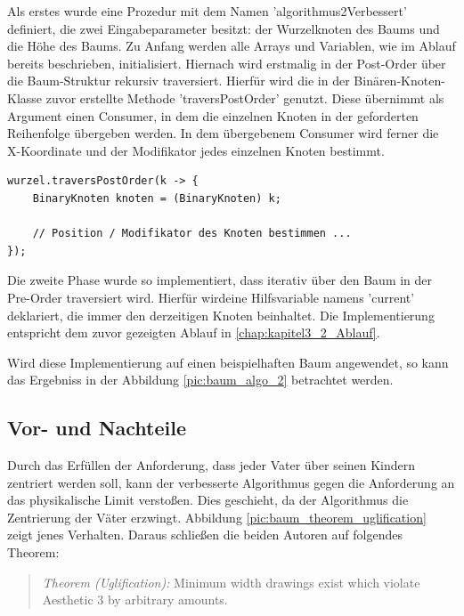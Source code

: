 Als erstes wurde eine Prozedur mit dem Namen 
'algorithmus2Verbessert' definiert, die zwei Eingabeparameter besitzt: der Wurzelknoten des Baums 
und die Höhe des Baums. Zu Anfang werden alle Arrays und Variablen, wie im Ablauf 
bereits beschrieben, initialisiert. Hiernach wird erstmalig in der Post-Order über 
die Baum-Struktur rekursiv traversiert. Hierfür wird die in der Binären-Knoten-Klasse 
zuvor erstellte Methode 'traversPostOrder' genutzt. Diese übernimmt als Argument einen Consumer, 
in dem die einzelnen Knoten in der geforderten Reihenfolge übergeben werden. In dem übergebenem Consumer 
wird ferner die X-Koordinate und der Modifikator jedes einzelnen Knoten bestimmt.

\begin{lstlisting}[caption=Vereinfachte Implementierung der Phase 1, label=code:algo2_phase1]
wurzel.traversPostOrder(k -> {
    BinaryKnoten knoten = (BinaryKnoten) k;

    // Position / Modifikator des Knoten bestimmen ...
});
\end{lstlisting}

Die zweite Phase wurde so implementiert, dass iterativ über den Baum in der Pre-Order traversiert 
wird. Hierfür wirdeine Hilfsvariable namens 'current' deklariert, die immer den derzeitigen Knoten beinhaltet. 
Die Implementierung entspricht dem zuvor gezeigten Ablauf in \ref{chap:kapitel3_2_Ablauf}. 

Wird diese Implementierung auf einen beispielhaften Baum angewendet, so kann das Ergebniss
in der Abbildung \ref{pic:baum_algo_2} betrachtet werden.


\subsection{Vor- und Nachteile}
Durch das Erfüllen der Anforderung, dass jeder Vater über seinen Kindern zentriert werden soll, kann der verbesserte Algorithmus gegen
die Anforderung an das physikalische Limit verstoßen. Dies geschieht, da der Algorithmus die Zentrierung der Väter erzwingt.
Abbildung \ref{pic:baum_theorem_uglification} zeigt jenes Verhalten. Daraus schließen die beiden Autoren auf folgendes Theorem:

\begin{quotation}
	\textit{Theorem (Uglification):} Minimum width drawings exist which violate Aesthetic 3 by arbitrary amounts.\cite[]{q1}
\end{quotation}

